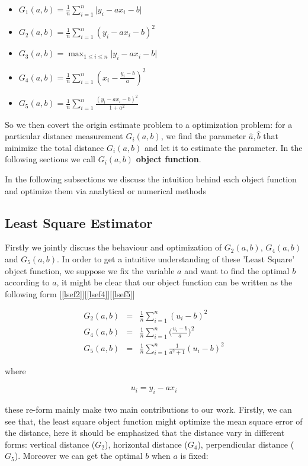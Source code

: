 \documentclass[twoside]{article}
\begin{document}
\begin{itemize}
  \item $G_1(a,b)=\frac{1}{n}\sum_{i=1}^n{\lvert y_i - a x_i - b\rvert}$
  \item $G_2(a,b)=\frac{1}{n}\sum_{i=1}^n{(y_i- a x_i - b)^2}$
  \item $G_3(a,b)=\max_{1 \le i\le n}{\lvert y_i - a x_i - b\rvert}$
  \item $G_4(a,b)=\frac{1}{n}\sum_{i=1}^n{(x_i-\frac{y_i-b}{a})^2}$
  \item $G_5(a,b)=\frac{1}{n}\sum_{i=1}^n{\frac{(y_i-a x_i - b)^2}{1+a^2}}$
\end{itemize}

So we then covert the origin estimate problem to a optimization problem: for a particular distance measurement $G_i(a,b)$, we find the parameter $\hat{a}, \hat{b}$ that minimize the total distance $G_i(a,b)$ and let it to estimate the parameter. In the following sections we call $G_i(a,b)$ \textbf{object function}.

In the following subsections we discuss the intuition behind each object function and optimize them via analytical or numerical methods

\subsection{Least Square Estimator}

Firstly we jointly discuss the behaviour and optimization of $G_2(a,b)$, $G_4(a,b)$ and $G_5(a,b)$. In order to get a intuitive understanding of these 'Least Square' object function, we suppose we fix the variable $a$ and want to find the optimal $b$ according to $a$, it might be clear that our object function can be written as the following form [\ref{lsef2}][\ref{lsef4}][\ref{lsef5}]

\begin{eqnarray}
\label{lsef2}
G_2(a,b) &=& \frac{1}{n} \sum_{i=1}^n{(u_i - b)^2} \\
\label{lsef4}
G_4(a,b) &=& \frac{1}{n} \sum_{i=1}^n{\big(\frac{u_i - b}{a}\big)^2} \\
\label{lsef5}
G_5(a,b) &=& \frac{1}{n} \sum_{i=1}^n{\frac{1}{a^2+1}(u_i-b)^2}
\end{eqnarray}

where 

\begin{eqnarray}
u_i = y_i - a x_i
\end{eqnarray}

these re-form mainly make two main contributions to our work. Firstly, we can see that, the least square object function might optimize the mean square error of the distance, here it should be emphasized that the distance vary in different forms: vertical distance ($G_2$), horizontal distance ($G_4$), perpendicular distance ($G_5$). Moreover we can get the optimal $b$ when $a$ is fixed:
\end{document}

